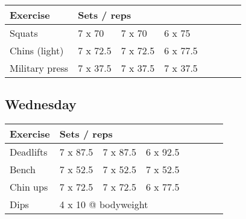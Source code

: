 \documentclass[12pt, a4paper]{article}%
\begin{document}
  \begin{tabular}{l|lllllll}
  \hspace{0.75em} \textbf{Exercise} & \multicolumn{ 7 }{l}{ \textbf{Sets / reps} } \\ \hline

            \hspace{0.75em} Squats
            & 7 x 70
            & 7 x 70
            & 6 x 75
            & 
            & 
            & 
            & 
            \\


            \hspace{0.75em} Chins (light)
            & 7 x 72.5
            & 7 x 72.5
            & 6 x 77.5
            & 
            & 
            & 
            & 
            \\


            \hspace{0.75em} Military press
            & 7 x 37.5
            & 7 x 37.5
            & 7 x 37.5
            & 
            & 
            & 
            & 
            \\


  \end{tabular}

  \subsection*{\hspace{0.5em} Wednesday }


  \begin{tabular}{l|lllllll}
  \hspace{0.75em} \textbf{Exercise} & \multicolumn{ 7 }{l}{ \textbf{Sets / reps} } \\ \hline

            \hspace{0.75em} Deadlifts
            & 7 x 87.5
            & 7 x 87.5
            & 6 x 92.5
            & 
            & 
            & 
            & 
            \\


            \hspace{0.75em} Bench
            & 7 x 52.5
            & 7 x 52.5
            & 7 x 52.5
            & 
            & 
            & 
            & 
            \\


            \hspace{0.75em} Chin ups
            & 7 x 72.5
            & 7 x 72.5
            & 6 x 77.5
            & 
            & 
            & 
            & 
            \\


   \hspace{0.75em} Dips &  \multicolumn{ 7 }{l}{ 4 x 10 @ bodyweight } \\
  \end{tabular}
\end{document}
